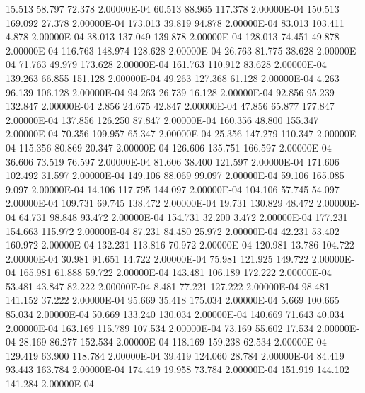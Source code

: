     15.513    58.797    72.378  2.00000E-04
    60.513    88.965   117.378  2.00000E-04
   150.513   169.092    27.378  2.00000E-04
   173.013    39.819    94.878  2.00000E-04
    83.013   103.411     4.878  2.00000E-04
    38.013   137.049   139.878  2.00000E-04
   128.013    74.451    49.878  2.00000E-04
   116.763   148.974   128.628  2.00000E-04
    26.763    81.775    38.628  2.00000E-04
    71.763    49.979   173.628  2.00000E-04
   161.763   110.912    83.628  2.00000E-04
   139.263    66.855   151.128  2.00000E-04
    49.263   127.368    61.128  2.00000E-04
     4.263    96.139   106.128  2.00000E-04
    94.263    26.739    16.128  2.00000E-04
    92.856    95.239   132.847  2.00000E-04
     2.856    24.675    42.847  2.00000E-04
    47.856    65.877   177.847  2.00000E-04
   137.856   126.250    87.847  2.00000E-04
   160.356    48.800   155.347  2.00000E-04
    70.356   109.957    65.347  2.00000E-04
    25.356   147.279   110.347  2.00000E-04
   115.356    80.869    20.347  2.00000E-04
   126.606   135.751   166.597  2.00000E-04
    36.606    73.519    76.597  2.00000E-04
    81.606    38.400   121.597  2.00000E-04
   171.606   102.492    31.597  2.00000E-04
   149.106    88.069    99.097  2.00000E-04
    59.106   165.085     9.097  2.00000E-04
    14.106   117.795   144.097  2.00000E-04
   104.106    57.745    54.097  2.00000E-04
   109.731    69.745   138.472  2.00000E-04
    19.731   130.829    48.472  2.00000E-04
    64.731    98.848    93.472  2.00000E-04
   154.731    32.200     3.472  2.00000E-04
   177.231   154.663   115.972  2.00000E-04
    87.231    84.480    25.972  2.00000E-04
    42.231    53.402   160.972  2.00000E-04
   132.231   113.816    70.972  2.00000E-04
   120.981    13.786   104.722  2.00000E-04
    30.981    91.651    14.722  2.00000E-04
    75.981   121.925   149.722  2.00000E-04
   165.981    61.888    59.722  2.00000E-04
   143.481   106.189   172.222  2.00000E-04
    53.481    43.847    82.222  2.00000E-04
     8.481    77.221   127.222  2.00000E-04
    98.481   141.152    37.222  2.00000E-04
    95.669    35.418   175.034  2.00000E-04
     5.669   100.665    85.034  2.00000E-04
    50.669   133.240   130.034  2.00000E-04
   140.669    71.643    40.034  2.00000E-04
   163.169   115.789   107.534  2.00000E-04
    73.169    55.602    17.534  2.00000E-04
    28.169    86.277   152.534  2.00000E-04
   118.169   159.238    62.534  2.00000E-04
   129.419    63.900   118.784  2.00000E-04
    39.419   124.060    28.784  2.00000E-04
    84.419    93.443   163.784  2.00000E-04
   174.419    19.958    73.784  2.00000E-04
   151.919   144.102   141.284  2.00000E-04

